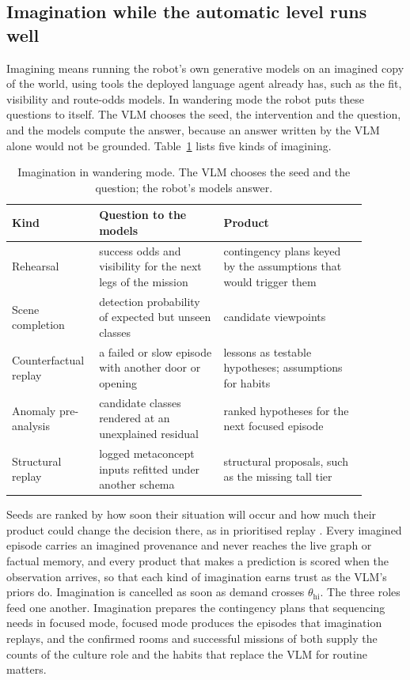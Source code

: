 \subsection{Imagination while the automatic level runs well}
\label{sec:lang_hierarchy:imagination}

Imagining means running the robot's own generative models on an imagined copy of the world, using tools the
deployed language agent already has, such as the fit, visibility and route-odds models. In wandering mode the robot
puts these questions to itself. The VLM chooses the seed, the intervention and the question, and the models compute
the answer, because an answer written by the VLM alone would not be grounded. Table~\ref{tab:lh_imagination} lists
five kinds of imagining.

\begin{table}[ht]
    \centering
    \small
    \begin{tabular}{|>{\raggedright\arraybackslash}p{0.18\linewidth}|>{\raggedright\arraybackslash}p{0.33\linewidth}|>{\raggedright\arraybackslash}p{0.38\linewidth}|}
        \hline
        \textbf{Kind} & \textbf{Question to the models} & \textbf{Product} \\ \hline
        Rehearsal & success odds and visibility for the next legs of the mission & contingency plans keyed by the assumptions that would trigger them \\ \hline
        Scene completion & detection probability of expected but unseen classes & candidate viewpoints \\ \hline
        Counterfactual replay & a failed or slow episode with another door or opening & lessons as testable hypotheses; assumptions for habits \\ \hline
        Anomaly pre-analysis & candidate classes rendered at an unexplained residual & ranked hypotheses for the next focused episode \\ \hline
        Structural replay & logged metaconcept inputs refitted under another schema & structural proposals, such as the missing tall tier \\ \hline
    \end{tabular}
    \caption{Imagination in wandering mode. The VLM chooses the seed and the question; the robot's models answer.}
    \label{tab:lh_imagination}
\end{table}

Seeds are ranked by how soon their situation will occur and how much their product could change the decision
there, as in prioritised replay \cite{mattar2018prioritized}. Every imagined episode carries an
imagined provenance and never reaches the live graph or factual memory, and every product that makes a prediction is
scored when the observation arrives, so that each kind of imagination earns trust as the VLM's priors do.
Imagination is cancelled as soon as demand crosses $\theta_{\text{hi}}$. The three roles feed one another.
Imagination prepares the contingency plans that sequencing needs in focused mode, focused mode produces the episodes
that imagination replays, and the confirmed rooms and successful missions of both supply the counts of the culture
role and the habits that replace the VLM for routine matters.

